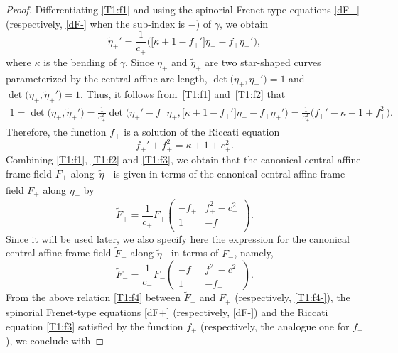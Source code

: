 \documentclass[pdftex]{sigma}
\numberwithin{equation}{section}
\def\bending{\kappa}
\begin{document}
\begin{proof}
	Differentiating \eqref{T1:f1} and using the spinorial Frenet-type equations \eqref{dF+} (respectively, \eqref{dF-} when the sub-index is $-$) of $\gamma$, we obtain
	\begin{equation}\label{T1:f2}
		\widetilde{\eta}_+'=\frac{1}{c_+}\bigl(\bigl[\bending+1-f_+'\bigr]\eta_+-f_+\eta_+'\bigr),
	\end{equation}
	where $\bending$ is the bending of $\gamma$. Since $\eta_+$ and $\widetilde{\eta}_+$ are two star-shaped curves parameterized by the central affine arc length, $\det \bigl(\eta_+,\eta_+'\bigr)=1$ and $\det \bigl(\widetilde{\eta}_+,\widetilde{\eta}_+'\bigr)=1$. Thus, it follows from~\eqref{T1:f1} and~\eqref{T1:f2} that
	\begin{align*}
		1=\det \bigl(\widetilde{\eta}_+,\widetilde{\eta}_+'\bigr) =\frac{1}{c_+^2}\det \bigl(\eta_+'-f_+\eta_+,\bigl[\bending+1-f_+'\bigr]\eta_+-f_+\eta_+'\bigr)
		 =\frac{1}{c_+^2}\bigl(f_+'-\bending-1+f_+^2\bigr).
	\end{align*}
	Therefore, the function $f_+$ is a solution of the Riccati equation
	\begin{equation}\label{T1:f3}
		f_+'+f_+^2=\bending+1+c_+^2.
	\end{equation}
	Combining \eqref{T1:f1}, \eqref{T1:f2} and \eqref{T1:f3}, we obtain that the canonical central affine frame field $\widetilde{F}_+$ along~$\widetilde{\eta}_+$ is given in terms of the canonical central affine frame field $F_+$ along $\eta_+$ by
	\begin{equation}\label{T1:f4}
		\widetilde{F}_+=\frac{1}{c_+}F_+\begin{pmatrix} -f_+ & f_+^2-c_+^2 \\ 1 & -f_+\end{pmatrix}.
	\end{equation}
	Since it will be used later, we also specify here the expression for the canonical central affine frame field $\widetilde{F}_-$ along $\widetilde{\eta}_-$ in terms of $F_-$, namely,
	\begin{equation}\label{T1:f4-}
		\widetilde{F}_-=\frac{1}{c_-}F_-\begin{pmatrix} -f_- & f_-^2-c_-^2 \\ 1 & -f_-\end{pmatrix}.
	\end{equation}
	From the above relation \eqref{T1:f4} between $\widetilde{F}_+$ and $F_+$ (respectively, \eqref{T1:f4-}), the spinorial Frenet-type equations \eqref{dF+} (respectively, \eqref{dF-}) and the Riccati equation \eqref{T1:f3} satisfied by the function $f_+$ (respectively, the analogue one for $f_-$), we conclude with

\end{proof}
\end{document}
